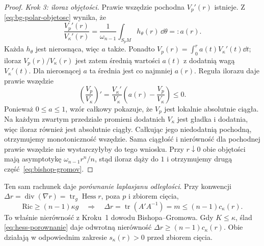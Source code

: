 \begin{proof}
\emph{Krok 3: iloraz objętości.} Prawie wszędzie
pochodna $V_p'(r)$ istnieje. Z
\eqref{eq:bg-polar-objetosc} wynika, że
\[
 \frac{V_p'(r)}{V_\kappa'(r)}
 =\frac1{\omega_{n-1}}
          \int_{S_pM}h_\theta(r)\,\dd\theta
 =:a(r).
\]
Każda $h_\theta$ jest nierosnąca,
więc $a$ także. Ponadto
$V_p(r)=\int_0^r a(t)V_\kappa'(t)\dd t$;
iloraz $V_p(r)/V_\kappa(r)$ jest zatem
średnią wartości $a(t)$ z dodatnią wagą
$V_\kappa'(t)$. Dla nierosnącej $a$
ta średnia jest co najmniej $a(r)$.
Reguła ilorazu daje prawie wszędzie
\[
 \left(\frac{V_p}{V_\kappa}\right)'
 =\frac{V_\kappa'}{V_\kappa}
   \left(a(r)-\frac{V_p}{V_\kappa}\right)\leq0.
\]
Ponieważ $0\leq a\leq1$, wzór całkowy pokazuje, że
$V_p$ jest lokalnie absolutnie ciągła. Na każdym zwartym
przedziale promieni dodatnich $V_\kappa$ jest gładka
i dodatnia, więc iloraz również jest absolutnie ciągły.
Całkując jego niedodatnią pochodną, otrzymujemy
monotoniczność wszędzie.
Sama ciągłość i nierówność dla pochodnej prawie wszędzie
nie wystarczyłyby do tego wniosku. Przy $r\downarrow0$ obie objętości
mają asymptotykę $\omega_{n-1}r^n/n$,
stąd iloraz dąży do $1$ i otrzymujemy
drugą część~\eqref{eq:bishop-gromov}.
\end{proof}

Ten sam rachunek daje \emph{porównanie laplasjanu
odległości}. Przy konwencji
$\Delta r=\operatorname{div}(\nabla r)
=\operatorname{tr}_g\operatorname{Hess}r$,
poza $p$ i zbiorem cięcia,
\begin{equation}\label{eq:laplasjan-porownanie}
 \mathrm{Ric}\geq(n-1)\kappa g
 \quad\Longrightarrow\quad
 \Delta r=\operatorname{tr}(A'A^{-1})
       =m\leq(n-1)c_\kappa(r).
\end{equation}
To właśnie nierówność z Kroku~1 dowodu
Bishopa--Gromowa. Gdy $K\leq\kappa$, ślad
\eqref{eq:hess-porownanie} daje odwrotną
nierówność $\Delta r\geq(n-1)c_\kappa(r)$.
Obie działają w odpowiednim zakresie
$s_\kappa(r)>0$ przed zbiorem cięcia.

